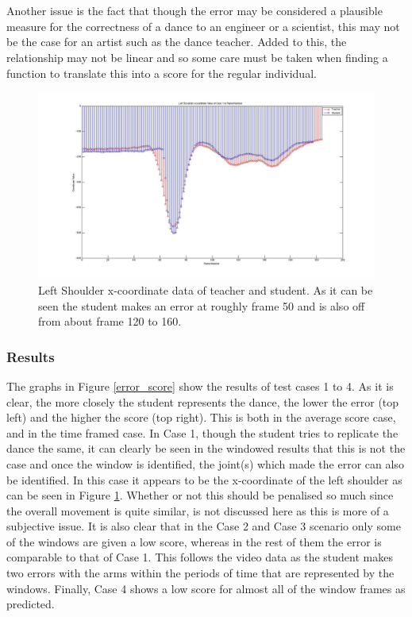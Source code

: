\documentclass[a4paper]{article}
\begin{document}
\\\\
\noindent
Another issue is the fact that though the error may be considered a plausible measure for the correctness of a dance to an engineer or a scientist, this may not be the case for an artist such as the dance teacher. Added to this, the relationship may not be linear and so some care must be taken when finding a function to translate this into a score for the regular individual.

\begin{figure}[H]
\centering
\includegraphics[scale=0.3]{Data_Analysis_LS_Correct.jpg}
\caption{Left Shoulder x-coordinate data of teacher and student. As it can be seen the student makes an error at roughly frame 50 and is also off from about frame 120 to 160.}
\label{error_left_shoulder}
\end{figure}

\subsubsection{Results}
\noindent
The graphs in Figure \ref{error_score} show the results of test cases 1 to 4. As it is clear, the more closely the student represents the dance, the lower the error (top left) and the higher the score (top right). This is both in the average score case, and in the time framed case. In Case 1, though the student tries to replicate the dance the same, it can clearly be seen in the windowed results that this is not the case and once the window is identified, the joint(s) which made the error can also be identified. In this case it appears to be the x-coordinate of the left shoulder as can be seen in Figure \ref{error_left_shoulder}. Whether or not this should be penalised so much since the overall movement is quite similar, is not discussed here as this is more of a subjective issue. It is also clear that in the Case 2 and Case 3 scenario only some of the windows are given a low score, whereas in the rest of them the error is comparable to that of Case 1. This follows the video data as the student makes two errors with the arms within the periods of time that are represented by the windows. Finally, Case 4 shows a low score for almost all of the window frames as predicted. 
\end{document}

